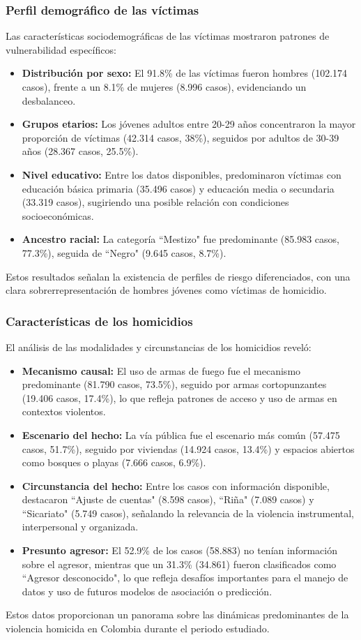 \documentclass[lettersize,journal]{IEEEtran}
\begin{document}
\subsubsection{Perfil demográfico de las víctimas}
Las características sociodemográficas de las víctimas mostraron patrones de vulnerabilidad específicos:
\begin{itemize}
\item \textbf{Distribución por sexo:} El 91.8\% de las víctimas fueron hombres (102.174 casos), frente a un 8.1\% de mujeres (8.996 casos), evidenciando un desbalanceo.
\item \textbf{Grupos etarios:} Los jóvenes adultos entre 20-29 años concentraron la mayor proporción de víctimas (42.314 casos, 38\%), seguidos por adultos de 30-39 años (28.367 casos, 25.5\%).
\item \textbf{Nivel educativo:} Entre los datos disponibles, predominaron víctimas con educación básica primaria (35.496 casos) y educación media o secundaria (33.319 casos), sugiriendo una posible relación con condiciones socioeconómicas.
\item \textbf{Ancestro racial:} La categoría ``Mestizo" fue predominante (85.983 casos, 77.3\%), seguida de ``Negro" (9.645 casos, 8.7\%).
\end{itemize}
Estos resultados señalan la existencia de perfiles de riesgo diferenciados, con una clara sobrerrepresentación de hombres jóvenes como víctimas de homicidio.
\subsubsection{Características de los homicidios}
El análisis de las modalidades y circunstancias de los homicidios reveló:
\begin{itemize}
\item \textbf{Mecanismo causal:} El uso de armas de fuego fue el mecanismo predominante (81.790 casos, 73.5\%), seguido por armas cortopunzantes (19.406 casos, 17.4\%), lo que refleja patrones de acceso y uso de armas en contextos violentos.
\item \textbf{Escenario del hecho:} La vía pública fue el escenario más común (57.475 casos, 51.7\%), seguido por viviendas (14.924 casos, 13.4\%) y espacios abiertos como bosques o playas (7.666 casos, 6.9\%).
\item \textbf{Circunstancia del hecho:} Entre los casos con información disponible, destacaron ``Ajuste de cuentas" (8.598 casos), ``Riña" (7.089 casos) y ``Sicariato" (5.749 casos), señalando la relevancia de la violencia instrumental, interpersonal y organizada.
\item \textbf{Presunto agresor:} El 52.9\% de los casos (58.883) no tenían información sobre el agresor, mientras que un 31.3\% (34.861) fueron clasificados como ``Agresor desconocido", lo que refleja desafíos importantes para el manejo de datos y uso de futuros modelos de asociación o predicción.
\end{itemize}
Estos datos proporcionan un panorama sobre las dinámicas predominantes de la violencia homicida en Colombia durante el periodo estudiado.
\end{document}
